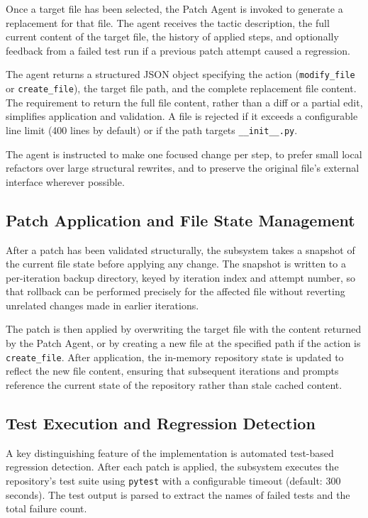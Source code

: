 Once a target file has been selected, the Patch Agent is invoked to generate a replacement for that file. The agent receives the tactic description, the full current content of the target file, the history of applied steps, and optionally feedback from a failed test run if a previous patch attempt caused a regression.

The agent returns a structured JSON object specifying the action (\texttt{modify\_file} or \texttt{create\_file}), the target file path, and the complete replacement file content. The requirement to return the full file content, rather than a diff or a partial edit, simplifies application and validation. A file is rejected if it exceeds a configurable line limit (400 lines by default) or if the path targets \texttt{\_\_init\_\_.py}.

The agent is instructed to make one focused change per step, to prefer small local refactors over large structural rewrites, and to preserve the original file's external interface wherever possible.

\subsection{Patch Application and File State Management}
\label{subsec:impl_apply}

After a patch has been validated structurally, the subsystem takes a snapshot of the current file state before applying any change. The snapshot is written to a per-iteration backup directory, keyed by iteration index and attempt number, so that rollback can be performed precisely for the affected file without reverting unrelated changes made in earlier iterations.

The patch is then applied by overwriting the target file with the content returned by the Patch Agent, or by creating a new file at the specified path if the action is \texttt{create\_file}. After application, the in-memory repository state is updated to reflect the new file content, ensuring that subsequent iterations and prompts reference the current state of the repository rather than stale cached content.

\subsection{Test Execution and Regression Detection}
\label{subsec:impl_tests}

A key distinguishing feature of the implementation is automated test-based regression detection. After each patch is applied, the subsystem executes the repository's test suite using \texttt{pytest} with a configurable timeout (default: 300 seconds). The test output is parsed to extract the names of failed tests and the total failure count.

